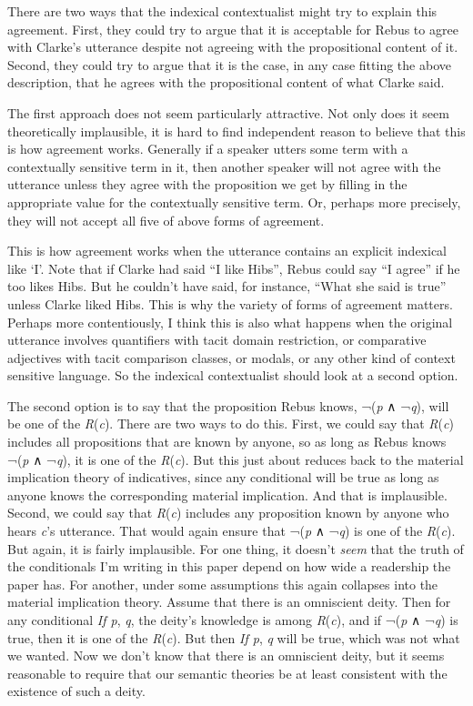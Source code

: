 \documentclass[
  11pt,
  letterpaper,
  DIV=11,
  numbers=noendperiod,
  twoside]{scrartcl}
\begin{document}
There are two ways that the indexical contextualist might try to explain
this agreement. First, they could try to argue that it is acceptable for
Rebus to agree with Clarke's utterance despite not agreeing with the
propositional content of it. Second, they could try to argue that it is
the case, in any case fitting the above description, that he agrees with
the propositional content of what Clarke said.

The first approach does not seem particularly attractive. Not only does
it seem theoretically implausible, it is hard to find independent reason
to believe that this is how agreement works. Generally if a speaker
utters some term with a contextually sensitive term in it, then another
speaker will not agree with the utterance unless they agree with the
proposition we get by filling in the appropriate value for the
contextually sensitive term. Or, perhaps more precisely, they will not
accept all five of above forms of agreement.

This is how agreement works when the utterance contains an explicit
indexical like `I'. Note that if Clarke had said ``I like Hibs'', Rebus
could say ``I agree'' if he too likes Hibs. But he couldn't have said,
for instance, ``What she said is true'' unless Clarke liked Hibs. This
is why the variety of forms of agreement matters. Perhaps more
contentiously, I think this is also what happens when the original
utterance involves quantifiers with tacit domain restriction, or
comparative adjectives with tacit comparison classes, or modals, or any
other kind of context sensitive language. So the indexical contextualist
should look at a second option.

The second option is to say that the proposition Rebus knows, ¬(\emph{p}
∧ ¬\emph{q}), will be one of the \emph{R}(\emph{c}). There are two ways
to do this. First, we could say that \emph{R}(\emph{c}) includes all
propositions that are known by anyone, so as long as Rebus knows
¬(\emph{p} ∧ ¬\emph{q}), it is one of the \emph{R}(\emph{c}). But this
just about reduces back to the material implication theory of
indicatives, since any conditional will be true as long as anyone knows
the corresponding material implication. And that is implausible. Second,
we could say that \emph{R}(\emph{c}) includes any proposition known by
anyone who hears \emph{c}'s utterance. That would again ensure that
¬(\emph{p} ∧ ¬\emph{q}) is one of the \emph{R}(\emph{c}). But again, it
is fairly implausible. For one thing, it doesn't \emph{seem} that the
truth of the conditionals I'm writing in this paper depend on how wide a
readership the paper has. For another, under some assumptions this again
collapses into the material implication theory. Assume that there is an
omniscient deity. Then for any conditional \emph{If p}, \emph{q}, the
deity's knowledge is among \emph{R}(\emph{c}), and if ¬(\emph{p} ∧
¬\emph{q}) is true, then it is one of the \emph{R}(\emph{c}). But then
\emph{If p}, \emph{q} will be true, which was not what we wanted. Now we
don't know that there is an omniscient deity, but it seems reasonable to
require that our semantic theories be at least consistent with the
existence of such a deity.
\end{document}
